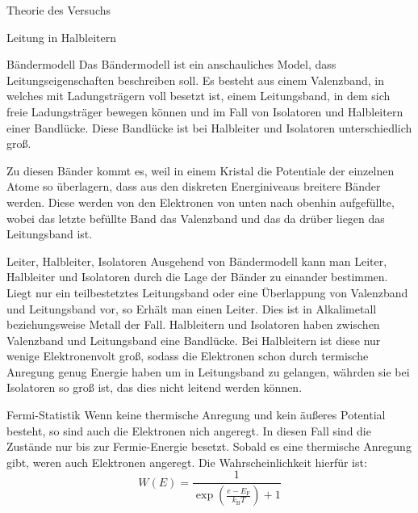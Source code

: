 \documentclass[pdftex, a4paper,11pt, twoside, ngerman]{report}
\begin{document}
  \begin{chapter}{Theorie des Versuchs}
    \label{chp:Theorie}
   
    \begin{section}{Leitung in Halbleitern}
        \begin{subsection}{Bändermodell}
            Das Bändermodell ist ein anschauliches Model, dass Leitungseigenschaften beschreiben soll. 
            Es besteht aus einem Valenzband, in welches mit Ladungsträgern voll besetzt ist, einem Leitungsband, in dem sich freie Ladungsträger bewegen können und im Fall von Isolatoren und Halbleitern einer Bandlücke.
            Diese Bandlücke ist bei Halbleiter und Isolatoren unterschiedlich groß.

            Zu diesen Bänder kommt es, weil in einem Kristal die Potentiale der einzelnen Atome so überlagern, dass aus den diskreten Energiniveaus breitere Bänder werden.
            Diese werden von den Elektronen von unten nach obenhin aufgefüllte, wobei das letzte befüllte Band das Valenzband und das da drüber liegen das Leitungsband ist.

        \end{subsection}

        \begin{subsection}{Leiter, Halbleiter, Isolatoren}
            Ausgehend von Bändermodell kann man Leiter, Halbleiter und Isolatoren durch die Lage der Bänder zu einander bestimmen.
            Liegt nur ein teilbestetztes Leitungsband oder eine Überlappung von Valenzband und Leitungsband vor, so Erhält man einen Leiter.
            Dies ist in Alkalimetall beziehungsweise Metall der Fall.
            Halbleitern und Isolatoren haben zwischen Valenzband und Leitungsband eine Bandlücke. 
            Bei Halbleitern ist diese nur wenige Elektronenvolt groß, sodass die Elektronen schon durch termische Anregung genug Energie haben um in Leitungsband zu gelangen, währden sie bei Isolatoren so groß ist, das dies nicht leitend werden können.

        \end{subsection}

        \begin{subsection}{Fermi-Statistik}
            Wenn keine thermische Anregung und kein äußeres Potential besteht, so sind auch die Elektronen nich angeregt.
            In diesen Fall sind die Zustände nur bis zur Fermie-Energie besetzt.
            Sobald es eine thermische Anregung gibt, weren auch Elektronen angeregt. Die Wahrscheinlichkeit hierfür ist:
            \[
                W(E) = \frac{1}{\exp({\frac{e-E_\text{F}}{k_\text{B}T}})+1}
            \]


\end{subsection}
\end{section}
\end{chapter}
\end{document}
